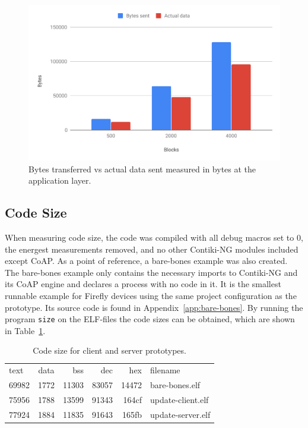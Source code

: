\documentclass[0-thesis.tex]{subfiles}
\begin{document}
\begin{figure}[t]
    \caption{Bytes transferred vs actual data sent measured in bytes at the application layer.}
    \label{fig:communication-overhead}
    \includegraphics[scale=0.77]{images/communication-overhead.pdf}
\end{figure}

\subsection{Code Size}
\label{ssec:code-size}
When measuring code size, the code was compiled with all debug macros set to 0, the
energest measurements removed, and no other Contiki-NG modules included except CoAP. As a
point of reference, a bare-bones example was also created. The bare-bones example only
contains the necessary imports to Contiki-NG and its CoAP engine and declares a process
with no code in it. It is the smallest runnable example for Firefly devices using the same
project configuration as the prototype. Its source code is found in
Appendix~\ref{app:bare-bones}. By running the program \texttt{size} on the ELF-files the
code sizes can be obtained, which are shown in Table~\ref{tab:code-size}.

\begin{table}[!t]
\begin{tabular}{l c r r r l}
text	&  data	 &  bss	 &  dec	 &  hex&filename\\
69982	&  1772	 &11303	 &83057	 &14472&bare-bones.elf\\
75956	&  1788	 &13599	 &91343	 &164cf&update-client.elf\\
77924	&  1884	 &11835	 &91643	 &165fb&update-server.elf
\end{tabular}
\caption{Code size for client and server prototypes.}
\label{tab:code-size}
\end{table}
\end{document}
